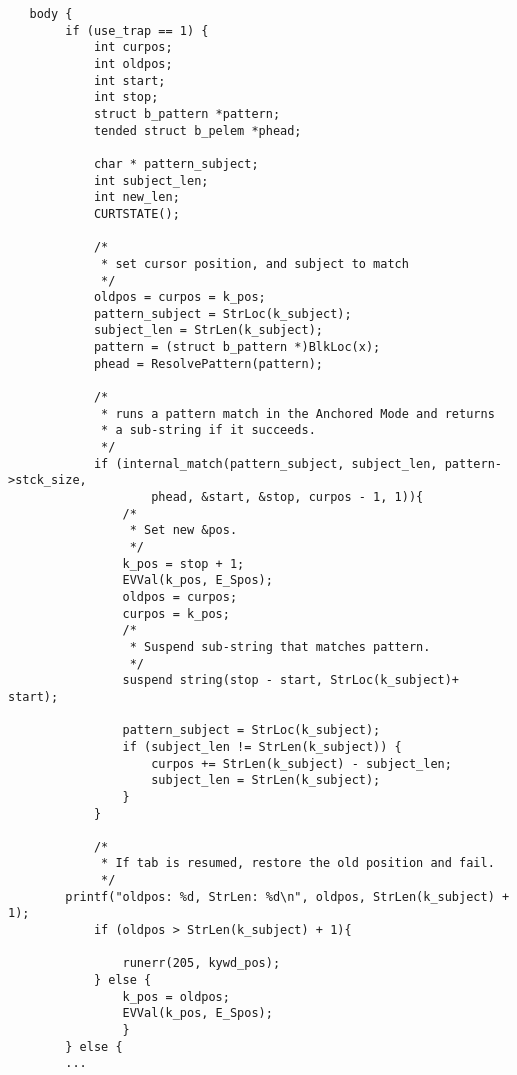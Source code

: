 \documentclass{article}
\begin{document}
\begin{verbatim}
   body {
		if (use_trap == 1) { 
			int curpos;
			int oldpos;
			int start;
			int stop;
			struct b_pattern *pattern;
			tended struct b_pelem *phead;
			
			char * pattern_subject;
			int subject_len;
			int new_len;
			CURTSTATE();
			
			/*
			 * set cursor position, and subject to match
			 */
			oldpos = curpos = k_pos;
			pattern_subject = StrLoc(k_subject);
			subject_len = StrLen(k_subject);
			pattern = (struct b_pattern *)BlkLoc(x);
			phead = ResolvePattern(pattern);
			
			/*
			 * runs a pattern match in the Anchored Mode and returns
			 * a sub-string if it succeeds.
			 */	
			if (internal_match(pattern_subject, subject_len, pattern->stck_size,
					phead, &start, &stop, curpos - 1, 1)){
				/*
				 * Set new &pos.
				 */ 
				k_pos = stop + 1;
				EVVal(k_pos, E_Spos);	
				oldpos = curpos;
				curpos = k_pos;
				/*
				 * Suspend sub-string that matches pattern.
				 */
				suspend string(stop - start, StrLoc(k_subject)+ start);
		
				pattern_subject = StrLoc(k_subject);
				if (subject_len != StrLen(k_subject)) {
					curpos += StrLen(k_subject) - subject_len;
					subject_len = StrLen(k_subject);
				}
			}
			
			/*
			 * If tab is resumed, restore the old position and fail.
			 */
		printf("oldpos: %d, StrLen: %d\n", oldpos, StrLen(k_subject) + 1);
			if (oldpos > StrLen(k_subject) + 1){
		
				runerr(205, kywd_pos);
			} else {
				k_pos = oldpos;
				EVVal(k_pos, E_Spos);
				}
		} else {
		...

\end{verbatim}

\pagebreak


\end{document}
